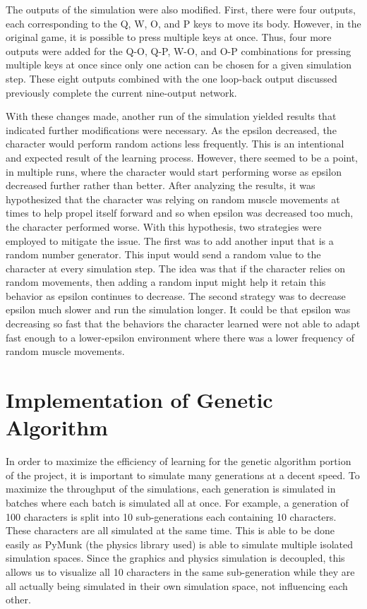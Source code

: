 \documentclass[letterpaper]{article} %
\begin{document}
\par The outputs of the simulation were also modified. First, there were four outputs, each corresponding to the Q, W, O, and P keys to move its body. However, in the original game, it is possible to press multiple keys at once. Thus, four more outputs were added for the Q-O, Q-P, W-O, and O-P combinations for pressing multiple keys at once since only one action can be chosen for a given simulation step. These eight outputs combined with the one loop-back output discussed previously complete the current nine-output network.
 
\par With these changes made, another run of the simulation yielded results that indicated further modifications were necessary. As the epsilon decreased, the character would perform random actions less frequently. This is an intentional and expected result of the learning process. However, there seemed to be a point, in multiple runs, where the character would start performing worse as epsilon decreased further rather than better. After analyzing the results, it was hypothesized that the character was relying on random muscle movements at times to help propel itself forward and so when epsilon was decreased too much, the character performed worse. With this hypothesis, two strategies were employed to mitigate the issue. The first was to add another input that is a random number generator. This input would send a random value to the character at every simulation step. The idea was that if the character relies on random movements, then adding a random input might help it retain this behavior as epsilon continues to decrease. The second strategy was to decrease epsilon much slower and run the simulation longer. It could be that epsilon was decreasing so fast that the behaviors the character learned were not able to adapt fast enough to a lower-epsilon environment where there was a lower frequency of random muscle movements.

\section{Implementation of Genetic Algorithm}

In order to maximize the efficiency of learning for the genetic algorithm portion of the project, it is important to simulate many generations at a decent speed. To maximize the throughput of the simulations, each generation is simulated in batches where each batch is simulated all at once. For example, a generation of 100 characters is split into 10 sub-generations each containing 10 characters. These characters are all simulated at the same time. This is able to be done easily as PyMunk (the physics library used) is able to simulate multiple isolated simulation spaces. Since the graphics and physics simulation is decoupled, this allows us to visualize all 10 characters in the same sub-generation while they are all actually being simulated in their own simulation space, not influencing each other.
\end{document}
